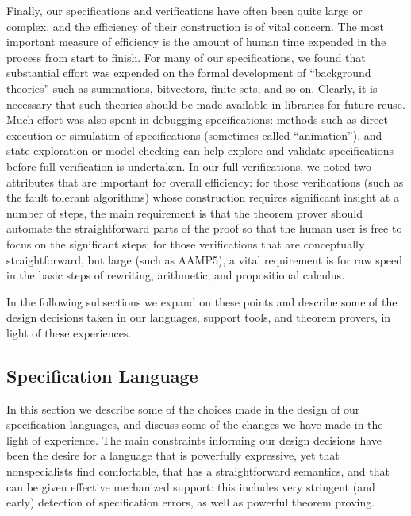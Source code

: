 Finally, our specifications and verifications have often been quite
large or complex, and the efficiency of their construction is of
vital concern.  The most important measure of efficiency is the
amount of human time expended in the process from start to finish.
For many of our specifications, we found that substantial effort was
expended on the formal development of ``background theories'' such as
summations, bitvectors, finite sets, and so on.  Clearly, it is
necessary that such theories should be made available in libraries
for future reuse.  Much effort was also spent in debugging
specifications: methods such as direct execution or simulation of
specifications (sometimes called ``animation''), and state
exploration or model checking can help explore and validate
specifications before full verification is undertaken.  In our full
verifications, we noted two attributes that are important for overall
efficiency: for those verifications (such as the fault tolerant
algorithms) whose construction requires significant insight at a
number of steps, the main requirement is that the theorem prover
should automate the straightforward parts of the proof so that the
human user is free to focus on the significant steps; for those
verifications that are conceptually straightforward, but large (such
as AAMP5), a vital requirement is for raw speed in the basic steps of
rewriting, arithmetic, and propositional calculus.

In the following subsections we expand on these points and describe
some of the design decisions taken in our languages, support tools,
and theorem provers, in light of these experiences.

\subsection{Specification Language}

In this section we describe some of the choices made in the design of
our specification languages, and discuss some of the changes we have
made in the light of experience.  The main constraints informing our
design decisions have been the desire for a language that is
powerfully expressive, yet that nonspecialists find comfortable,
that has a straightforward semantics, and that can be given effective
mechanized support: this includes very stringent (and early)
detection of specification errors, as well as powerful theorem
proving.

